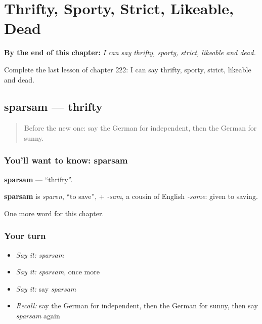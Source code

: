 
\chapter{Thrifty, Sporty, Strict, Likeable, Dead}
\label{ch:ge-thrifty-sporty-strict-likeable-dead}

\begin{chapteropening}
\textbf{By the end of this chapter:} \emph{I can say thrifty, sporty, strict, likeable and dead.}

Complete the last lesson of chapter 222: I can say thrifty, sporty, strict, likeable and dead.
\end{chapteropening}

\section[sparsam]{sparsam — thrifty}

\label{lesson:GE-C222-sparsam}



\begin{quote}
Before the new one: say the German for independent, then the German for sunny.
\end{quote}

\subsection*{You'll want to know: sparsam}
\textbf{sparsam} — \textquotedblleft{}thrifty\textquotedblright{}.

\begin{cousinweb}
\textbf{sparsam} is \emph{sparen}, \textquotedblleft{}to save\textquotedblright{}, + \emph{-sam}, a cousin of English \emph{-some}: given to saving.
\end{cousinweb}

\begin{grammarlens}[title={What you've built}]
One more word for this chapter.
\end{grammarlens}

\subsection*{Your turn}
\begin{itemize}
\raggedright
  \item \emph{Say it:} \emph{sparsam}
  \item \emph{Say it:} \emph{sparsam}, once more
  \item \emph{Say it:} say \emph{sparsam}
  \item \emph{Recall:} say the German for independent, then the German for sunny, then say \emph{sparsam} again
\end{itemize}

